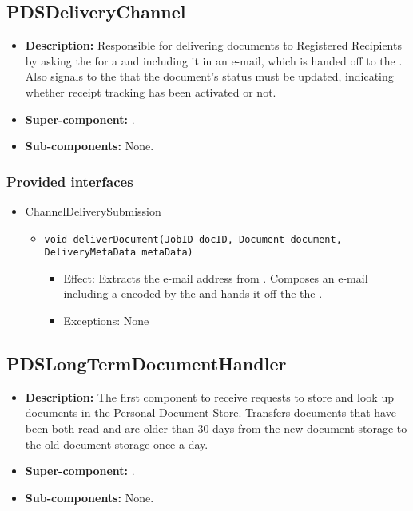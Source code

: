 \subsection{PDSDeliveryChannel}
\begin{itemize}
    \item \textbf{Description:} Responsible for delivering documents to Registered Recipients by asking the  for a  and including it in an e-mail, which is handed off to the . Also signals to the  that the document's status must be updated, indicating whether receipt tracking has been activated or not.
    \item \textbf{Super-component:} .
    \item \textbf{Sub-components:} None.
\end{itemize}

\subsubsection*{Provided interfaces}
\begin{itemize}
    \item ChannelDeliverySubmission
    \begin{itemize}
        \item \texttt{void deliverDocument(JobID docID, Document document, DeliveryMetaData metaData)}
        \begin{itemize}
            \item Effect: Extracts the e-mail address from . Composes an e-mail including a  encoded by the  and hands it off the the .
            \item Exceptions: None
        \end{itemize}
    \end{itemize}
\end{itemize}

\subsection{PDSLongTermDocumentHandler}
\begin{itemize}
    \item \textbf{Description:} The first component to receive requests to store and look up documents in the Personal Document Store. Transfers documents that have been both read and are older than 30 days from the new document storage to the old document storage once a day.
    \item \textbf{Super-component:} .
    \item \textbf{Sub-components:} None.
\end{itemize}

